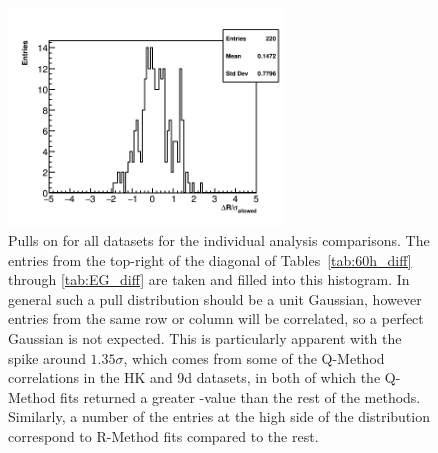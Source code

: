 \begin{figure}
\centering
\includegraphics[width=0.65\textwidth]{AllSigmas}
\caption{Pulls on \R for all datasets for the individual analysis comparisons. The entries from the top-right of the diagonal of Tables~\ref{tab:60h_diff} through \ref{tab:EG_diff} are taken and filled into this histogram. In general such a pull distribution should be a unit Gaussian, however entries from the same row or column will be correlated, so a perfect Gaussian is not expected. This is particularly apparent with the spike around $1.35\sigma$, which comes from some of the Q-Method correlations in the HK and 9d datasets, in both of which the Q-Method fits returned a greater \R-value than the rest of the methods. Similarly, a number of the entries at the high side of the distribution correspond to R-Method fits compared to the rest.}
\label{fig:AllSigmas}
\end{figure}




